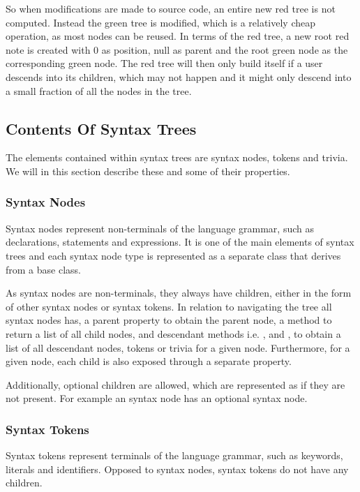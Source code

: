 So when modifications are made to source code, an entire new red tree is not computed. Instead the green tree is modified, which is a relatively cheap operation, as most nodes can be reused. In terms of the red tree, a new root red note is created with 0 as position, null as parent and the root green node as the corresponding green node. The red tree will then only build itself if a user descends into its children, which may not happen and it might only descend into a small fraction of all the nodes in the tree\cite{sadovRoslynPerf}. %

\subsection{Contents Of Syntax Trees}
The elements contained within syntax trees are syntax nodes, tokens and trivia. We will in this section describe these and some of their properties.

\subsubsection{Syntax Nodes}
Syntax nodes represent non-terminals of the language grammar, such as declarations, statements and expressions. It is one of the main elements of syntax trees and each syntax node type is represented as a separate class that derives from a base  class.

As syntax nodes are non-terminals, they always have children, either in the form of other syntax nodes or syntax tokens. In relation to navigating the tree all syntax nodes has, a parent property to obtain the parent node, a  method to return a list of all child nodes, and descendant methods i.e. ,  and , to obtain a list of all descendant nodes, tokens or trivia for a given node. Furthermore, for a given node, each child is also exposed through a separate property\cite[p. 7]{ng2012roslyn}.

Additionally, optional children are allowed, which are represented as  if they are not present. For example an  syntax node has an optional  syntax node\cite[p. 7]{ng2012roslyn}.

\subsubsection{Syntax Tokens}
Syntax tokens represent terminals of the language grammar, such as keywords, literals and identifiers. Opposed to syntax nodes, syntax tokens do not have any children. 

